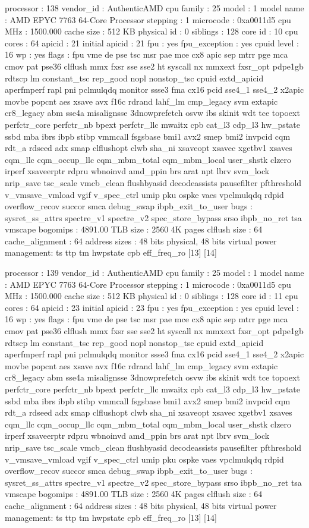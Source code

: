 processor	: 138
vendor_id	: AuthenticAMD
cpu family	: 25
model		: 1
model name	: AMD EPYC 7763 64-Core Processor
stepping	: 1
microcode	: 0xa0011d5
cpu MHz		: 1500.000
cache size	: 512 KB
physical id	: 0
siblings	: 128
core id		: 10
cpu cores	: 64
apicid		: 21
initial apicid	: 21
fpu		: yes
fpu_exception	: yes
cpuid level	: 16
wp		: yes
flags		: fpu vme de pse tsc msr pae mce cx8 apic sep mtrr pge mca cmov pat pse36 clflush mmx fxsr sse sse2 ht syscall nx mmxext fxsr_opt pdpe1gb rdtscp lm constant_tsc rep_good nopl nonstop_tsc cpuid extd_apicid aperfmperf rapl pni pclmulqdq monitor ssse3 fma cx16 pcid sse4_1 sse4_2 x2apic movbe popcnt aes xsave avx f16c rdrand lahf_lm cmp_legacy svm extapic cr8_legacy abm sse4a misalignsse 3dnowprefetch osvw ibs skinit wdt tce topoext perfctr_core perfctr_nb bpext perfctr_llc mwaitx cpb cat_l3 cdp_l3 hw_pstate ssbd mba ibrs ibpb stibp vmmcall fsgsbase bmi1 avx2 smep bmi2 invpcid cqm rdt_a rdseed adx smap clflushopt clwb sha_ni xsaveopt xsavec xgetbv1 xsaves cqm_llc cqm_occup_llc cqm_mbm_total cqm_mbm_local user_shstk clzero irperf xsaveerptr rdpru wbnoinvd amd_ppin brs arat npt lbrv svm_lock nrip_save tsc_scale vmcb_clean flushbyasid decodeassists pausefilter pfthreshold v_vmsave_vmload vgif v_spec_ctrl umip pku ospke vaes vpclmulqdq rdpid overflow_recov succor smca debug_swap ibpb_exit_to_user
bugs		: sysret_ss_attrs spectre_v1 spectre_v2 spec_store_bypass srso ibpb_no_ret tsa vmscape
bogomips	: 4891.00
TLB size	: 2560 4K pages
clflush size	: 64
cache_alignment	: 64
address sizes	: 48 bits physical, 48 bits virtual
power management: ts ttp tm hwpstate cpb eff_freq_ro [13] [14]

processor	: 139
vendor_id	: AuthenticAMD
cpu family	: 25
model		: 1
model name	: AMD EPYC 7763 64-Core Processor
stepping	: 1
microcode	: 0xa0011d5
cpu MHz		: 1500.000
cache size	: 512 KB
physical id	: 0
siblings	: 128
core id		: 11
cpu cores	: 64
apicid		: 23
initial apicid	: 23
fpu		: yes
fpu_exception	: yes
cpuid level	: 16
wp		: yes
flags		: fpu vme de pse tsc msr pae mce cx8 apic sep mtrr pge mca cmov pat pse36 clflush mmx fxsr sse sse2 ht syscall nx mmxext fxsr_opt pdpe1gb rdtscp lm constant_tsc rep_good nopl nonstop_tsc cpuid extd_apicid aperfmperf rapl pni pclmulqdq monitor ssse3 fma cx16 pcid sse4_1 sse4_2 x2apic movbe popcnt aes xsave avx f16c rdrand lahf_lm cmp_legacy svm extapic cr8_legacy abm sse4a misalignsse 3dnowprefetch osvw ibs skinit wdt tce topoext perfctr_core perfctr_nb bpext perfctr_llc mwaitx cpb cat_l3 cdp_l3 hw_pstate ssbd mba ibrs ibpb stibp vmmcall fsgsbase bmi1 avx2 smep bmi2 invpcid cqm rdt_a rdseed adx smap clflushopt clwb sha_ni xsaveopt xsavec xgetbv1 xsaves cqm_llc cqm_occup_llc cqm_mbm_total cqm_mbm_local user_shstk clzero irperf xsaveerptr rdpru wbnoinvd amd_ppin brs arat npt lbrv svm_lock nrip_save tsc_scale vmcb_clean flushbyasid decodeassists pausefilter pfthreshold v_vmsave_vmload vgif v_spec_ctrl umip pku ospke vaes vpclmulqdq rdpid overflow_recov succor smca debug_swap ibpb_exit_to_user
bugs		: sysret_ss_attrs spectre_v1 spectre_v2 spec_store_bypass srso ibpb_no_ret tsa vmscape
bogomips	: 4891.00
TLB size	: 2560 4K pages
clflush size	: 64
cache_alignment	: 64
address sizes	: 48 bits physical, 48 bits virtual
power management: ts ttp tm hwpstate cpb eff_freq_ro [13] [14]

